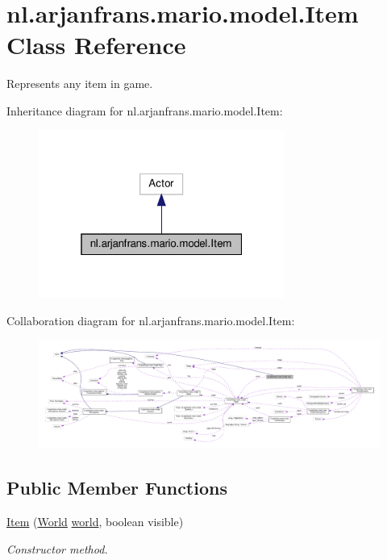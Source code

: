 \hypertarget{classnl_1_1arjanfrans_1_1mario_1_1model_1_1Item}{}\section{nl.\+arjanfrans.\+mario.\+model.\+Item Class Reference}
\label{classnl_1_1arjanfrans_1_1mario_1_1model_1_1Item}


Represents any item in game.  




Inheritance diagram for nl.\+arjanfrans.\+mario.\+model.\+Item\+:\nopagebreak
\begin{figure}[H]
\begin{center}
\leavevmode
\includegraphics[width=229pt]{classnl_1_1arjanfrans_1_1mario_1_1model_1_1Item__inherit__graph}
\end{center}
\end{figure}


Collaboration diagram for nl.\+arjanfrans.\+mario.\+model.\+Item\+:
\nopagebreak
\begin{figure}[H]
\begin{center}
\leavevmode
\includegraphics[width=350pt]{classnl_1_1arjanfrans_1_1mario_1_1model_1_1Item__coll__graph}
\end{center}
\end{figure}
\subsection*{Public Member Functions}
\begin{DoxyCompactItemize}
\item 
\hyperlink{classnl_1_1arjanfrans_1_1mario_1_1model_1_1Item_ae2c1344d50ddfa3e22fca0f1afa7f31f}{Item} (\hyperlink{classnl_1_1arjanfrans_1_1mario_1_1model_1_1World}{World} \hyperlink{classnl_1_1arjanfrans_1_1mario_1_1model_1_1Item_ae5d6d1a768987daac29679cf194ee95d}{world}, boolean visible)
\begin{DoxyCompactList}\small\item\em Constructor method. \end{DoxyCompactList}\end{DoxyCompactItemize}
